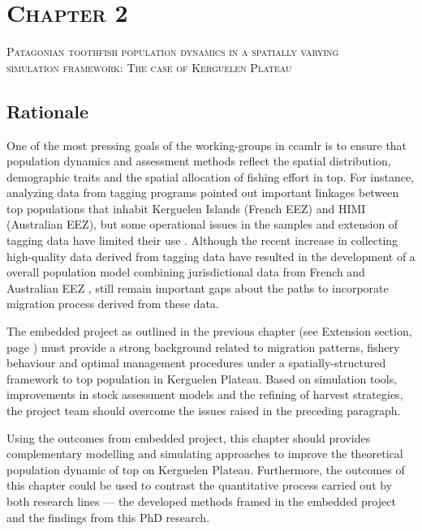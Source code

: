 \section*{\scshape Chapter 2}
{\Large \scshape Patagonian toothfish population dynamics in a spatially varying \\ simulation framework: The case of Kerguelen Plateau} %
\label{sec:chapter2}


\subsection*{Rationale}

One of the most pressing goals of the working-groups in \ac{ccamlr} is to ensure that population dynamics and assessment methods reflect the spatial distribution, demographic traits and the spatial allocation of fishing effort in \acl{top}. For instance, analyzing data from tagging programs \citet{secaetal2011} pointed out important linkages between \acl{top} populations that inhabit Kerguelen Islands (French EEZ) and HIMI (Australian EEZ), but some operational issues in the samples and extension of tagging data have limited their use \citep{candyCons2008}. Although  the recent increase in collecting high-quality data derived from tagging data have resulted in the development of a overall population model combining jurisdictional data from French and Australian EEZ \citep{Candy2011b}, still remain important gaps about the paths to incorporate migration process derived from these data.

The embedded project as outlined in the previous chapter (see Extension section, page \pageref{subsec:extsupp}) must provide a strong background related to migration patterns, fishery behaviour and optimal management procedures under a spatially-structured framework to \acl{top} population in Kerguelen Plateau. Based on  simulation tools, improvements in stock assessment models and the refining of harvest strategies, the project team should overcome the issues raised in the preceding paragraph.

Using the outcomes from embedded project, this chapter should provides complementary modelling and simulating approaches to improve the theoretical population dynamic of \acl{top} on Kerguelen Plateau. Furthermore, the outcomes of this chapter could be used to contrast the quantitative process carried out by both research lines --- the developed methods framed in the embedded project and the findings from this PhD research.  


